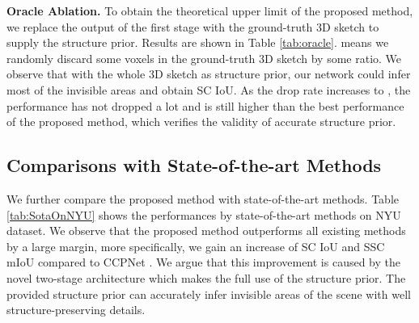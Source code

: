 \documentclass[10pt,twocolumn,letterpaper]{article}
\begin{document}
\begin{table}[htbp]
\begin{center}
\vspace{-0.2cm}
\end{center}
\caption{\textbf{Oracle Ablation}. \textit{(Oracle) Drop Rate} means we randomly drop the ground-truth sketch in a certain proportion. We perform this ablation study on NYUCAD dataset.}
\label{tab:oracle}
\end{table} 
\noindent \textbf{Oracle Ablation.} To obtain the theoretical upper limit of the proposed method, we replace the output of the first stage with the ground-truth 3D sketch to supply the structure prior. Results are shown in Table \ref{tab:oracle}.  means we randomly discard some voxels in the ground-truth 3D sketch by some ratio. We observe that with the whole 3D sketch as structure prior, our network could infer most of the invisible areas and obtain  SC IoU. As the drop rate increases to , the performance has not dropped a lot and is still higher than the best performance of the proposed method, which verifies the validity of accurate structure prior.

\subsection{Comparisons with State-of-the-art Methods}
We further compare the proposed method with state-of-the-art methods. Table \ref{tab:SotaOnNYU} shows the performances by state-of-the-art methods on NYU dataset. We observe that the proposed method outperforms all existing methods by a large margin, more specifically, we gain an increase of  SC IoU and  SSC mIoU compared to CCPNet \cite{zhang2019cascaded-ccpnet}. We argue that this improvement is caused by the novel two-stage architecture which makes the full use of the structure prior. The provided structure prior can accurately infer invisible areas of the scene with well structure-preserving details.
\end{document}
